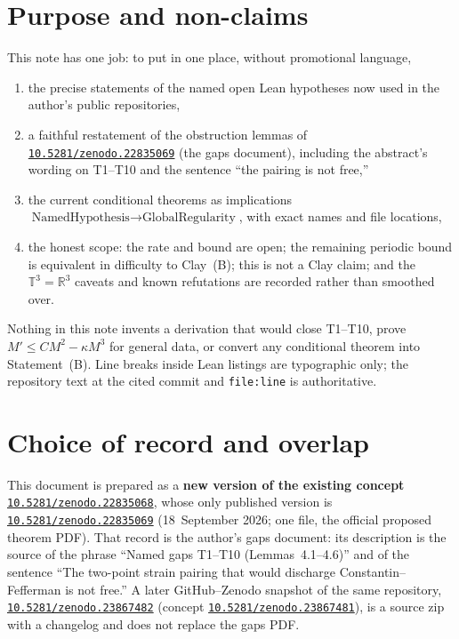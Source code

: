 \documentclass[11pt]{article}
\theoremstyle{plain}
\theoremstyle{definition}
\theoremstyle{remark}
\newcommand{\Tthree}{\mathbb{T}^{3}}
\newcommand{\R}{\mathbb{R}}
\newcommand{\doi}[1]{\href{https://doi.org/#1}{\texttt{#1}}}
\begin{document}
\tableofcontents
\newpage

\section{Purpose and non-claims}

This note has one job: to put in one place, without promotional language,
\begin{enumerate}[leftmargin=1.4em]
\item the precise statements of the named open Lean hypotheses now used in the author's public repositories,
\item a faithful restatement of the obstruction lemmas of \doi{10.5281/zenodo.22835069} (the gaps document), including the abstract's wording on T1--T10 and the sentence ``the pairing is not free,''
\item the current conditional theorems as implications \(\text{NamedHypothesis}\to\text{GlobalRegularity}\), with exact names and file locations,
\item the honest scope: the rate and bound are open; the remaining periodic bound is equivalent in difficulty to Clay~(B); this is not a Clay claim; and the \(\Tthree=\R^{3}\) caveats and known refutations are recorded rather than smoothed over.
\end{enumerate}

Nothing in this note invents a derivation that would close T1--T10, prove \(M'\le C M^{2}-\kappa M^{3}\) for general data, or convert any conditional theorem into Statement~(B). Line breaks inside Lean listings are typographic only; the repository text at the cited commit and \texttt{file:line} is authoritative.

\section{Choice of record and overlap}

This document is prepared as a \textbf{new version of the existing concept} \doi{10.5281/zenodo.22835068}, whose only published version is \doi{10.5281/zenodo.22835069} (18~September 2026; one file, the official proposed theorem PDF). That record is the author's gaps document: its description is the source of the phrase ``Named gaps T1--T10 (Lemmas~4.1--4.6)'' and of the sentence ``The two-point strain pairing that would discharge Constantin--Fefferman is not free.'' A later GitHub--Zenodo snapshot of the same repository, \doi{10.5281/zenodo.23867482} (concept \doi{10.5281/zenodo.23867481}), is a source zip with a changelog and does not replace the gaps PDF.
\end{document}
